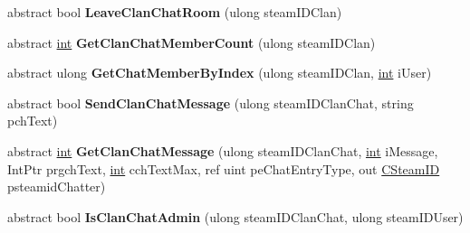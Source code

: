 \begin{DoxyCompactItemize}
\item 
\hypertarget{classValve_1_1Steamworks_1_1ISteamFriends_ace7ab33ed48f15ff62d00e3b33afc9e9}{}abstract bool {\bfseries Leave\+Clan\+Chat\+Room} (ulong steam\+I\+D\+Clan)\label{classValve_1_1Steamworks_1_1ISteamFriends_ace7ab33ed48f15ff62d00e3b33afc9e9}

\item 
\hypertarget{classValve_1_1Steamworks_1_1ISteamFriends_ac3924de42bcfcc7cad220f7b21460027}{}abstract \hyperlink{SDL__thread_8h_a6a64f9be4433e4de6e2f2f548cf3c08e}{int} {\bfseries Get\+Clan\+Chat\+Member\+Count} (ulong steam\+I\+D\+Clan)\label{classValve_1_1Steamworks_1_1ISteamFriends_ac3924de42bcfcc7cad220f7b21460027}

\item 
\hypertarget{classValve_1_1Steamworks_1_1ISteamFriends_a3002ae2b9693346e5e7eda7d2e56db4f}{}abstract ulong {\bfseries Get\+Chat\+Member\+By\+Index} (ulong steam\+I\+D\+Clan, \hyperlink{SDL__thread_8h_a6a64f9be4433e4de6e2f2f548cf3c08e}{int} i\+User)\label{classValve_1_1Steamworks_1_1ISteamFriends_a3002ae2b9693346e5e7eda7d2e56db4f}

\item 
\hypertarget{classValve_1_1Steamworks_1_1ISteamFriends_a1f71b465ec0fa060139e06bdc6f23b7d}{}abstract bool {\bfseries Send\+Clan\+Chat\+Message} (ulong steam\+I\+D\+Clan\+Chat, string pch\+Text)\label{classValve_1_1Steamworks_1_1ISteamFriends_a1f71b465ec0fa060139e06bdc6f23b7d}

\item 
\hypertarget{classValve_1_1Steamworks_1_1ISteamFriends_aeb5c60ce5e9d3ef7eeee033461815e83}{}abstract \hyperlink{SDL__thread_8h_a6a64f9be4433e4de6e2f2f548cf3c08e}{int} {\bfseries Get\+Clan\+Chat\+Message} (ulong steam\+I\+D\+Clan\+Chat, \hyperlink{SDL__thread_8h_a6a64f9be4433e4de6e2f2f548cf3c08e}{int} i\+Message, Int\+Ptr prgch\+Text, \hyperlink{SDL__thread_8h_a6a64f9be4433e4de6e2f2f548cf3c08e}{int} cch\+Text\+Max, ref uint pe\+Chat\+Entry\+Type, out \hyperlink{structValve_1_1Steamworks_1_1CSteamID}{C\+Steam\+I\+D} psteamid\+Chatter)\label{classValve_1_1Steamworks_1_1ISteamFriends_aeb5c60ce5e9d3ef7eeee033461815e83}

\item 
\hypertarget{classValve_1_1Steamworks_1_1ISteamFriends_a45be3e0de258f8b43734a966b1322ae3}{}abstract bool {\bfseries Is\+Clan\+Chat\+Admin} (ulong steam\+I\+D\+Clan\+Chat, ulong steam\+I\+D\+User)\label{classValve_1_1Steamworks_1_1ISteamFriends_a45be3e0de258f8b43734a966b1322ae3}


\end{DoxyCompactItemize}
